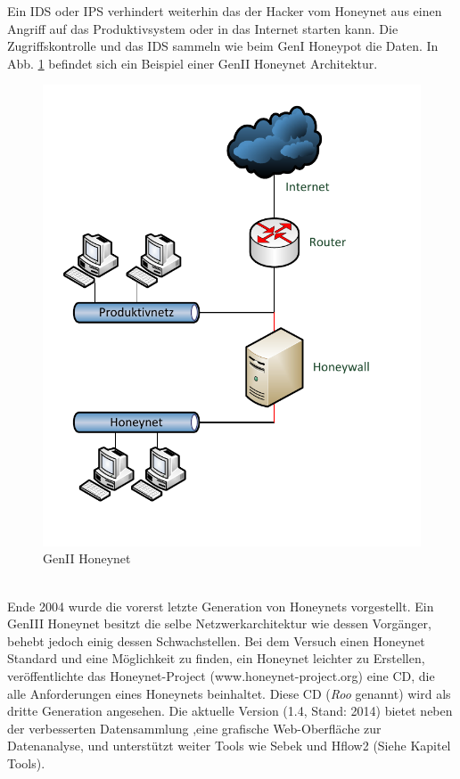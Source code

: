Ein IDS oder IPS verhindert weiterhin das der Hacker vom Honeynet aus einen Angriff auf das Produktivsystem oder in das Internet starten kann. Die Zugriffskontrolle und das IDS sammeln wie beim GenI Honeypot die Daten. In Abb. \ref{hnet:genii} befindet sich ein Beispiel einer GenII Honeynet Architektur.
\\
\begin{figure}[]
    \centering\includegraphics[scale=0.5]{Bilder/GenII.pdf}
  \caption{GenII Honeynet}
  \label{hnet:genii}
\end{figure}
\\
\noindent Ende 2004 wurde die vorerst letzte Generation von Honeynets vorgestellt. Ein GenIII Honeynet besitzt die selbe Netzwerkarchitektur wie dessen Vorgänger, behebt jedoch einig dessen Schwachstellen. Bei dem Versuch einen Honeynet Standard und eine Möglichkeit zu finden, ein Honeynet leichter zu Erstellen, veröffentlichte das Honeynet-Project (www.honeynet-project.org) eine CD, die alle Anforderungen eines Honeynets beinhaltet. Diese CD (\emph{Roo} genannt) wird als dritte Generation angesehen. Die aktuelle Version (1.4, Stand: 2014) bietet neben der verbesserten Datensammlung ,eine grafische Web-Oberfläche zur Datenanalyse, und unterstützt weiter Tools wie Sebek und Hflow2 (Siehe Kapitel Tools).